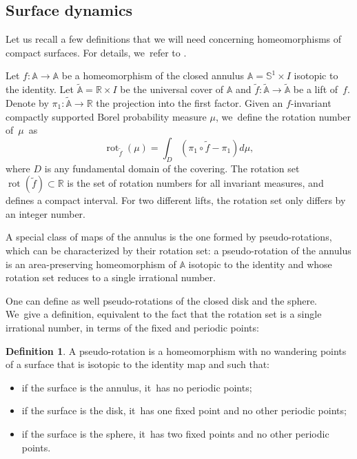 \documentclass[10pt]{amsart}
\theoremstyle{definition}
\newtheorem{defi}[theorem]{Definition}
\newcommand{\mS}{\mathbb{S}}
\begin{document}
\subsection{Surface dynamics}\label{ssec-surfacedyn}
Let us recall a few definitions that we will need concerning homeomorphisms of compact surfaces. For details, we~refer to \cite{BCLP, Lec1}.

Let $f: \mathbb{A}\to \mathbb{A}$ be a homeomorphism of the closed annulus $\mathbb{A}=\mS^1\times I$ isotopic to the identity. Let $\widetilde{\mathbb{A}}=\mathbb{R}\times I$ be
the universal cover of $\mathbb{A}$ and $\widetilde f: \widetilde{\mathbb{A}} \to \widetilde{\mathbb{A}}$ be a lift of~$f$. Denote by $\pi_1: \widetilde{\mathbb{A}} \to \mathbb{R}$ the projection into the first factor. Given an $f$-invariant compactly supported Borel probability measure $\mu$, we~define the rotation number of~$\mu$~as
\[
\operatorname{rot}_{\widetilde f}(\mu)=\int_D (\pi_1\circ \widetilde f - \pi_1)d\mu,
\]
where $D$ is any fundamental domain of the covering. The rotation set $\operatorname{rot}(\widetilde f)\subset \mathbb{R}$ is the set of rotation numbers for all invariant measures, and defines a compact interval. For two different lifts, the rotation set only differs by an integer number.

A special class of maps of the annulus is the one formed by pseudo-rotations, which can be characterized by their rotation set:
a pseudo-rotation of the annulus is an area-preserving homeomorphism of $\mathbb{A}$ isotopic to the identity and whose rotation set reduces to a single irrational number.

One can define as well pseudo-rotations of the closed disk and the sphere. We~give a definition, equivalent to the fact that the rotation set is a single irrational number, in terms of the fixed and periodic points:
\begin{defi}
A pseudo-rotation is a homeomorphism with no wandering points of a surface that is isotopic to the identity map and such that:
\begin{itemize}
\item
if the surface is the annulus, it~has no periodic points;
\item
if the surface is the disk, it~has one fixed point and no other periodic points;
\item
if the surface is the sphere, it~has two fixed points and no other periodic points.
\end{itemize}
\end{defi}
\end{document}
